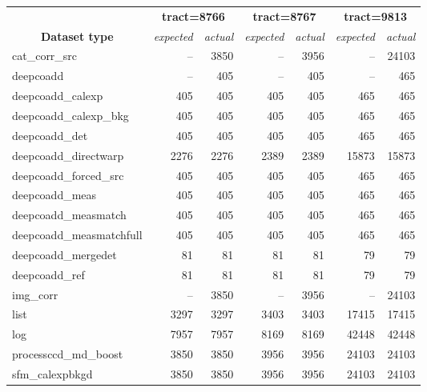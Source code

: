 \begin{table}
	\caption{
		File counts. Expected values came from corresponding weekly RC
		exections. Symbol \dag{} dentoes dataset types which differs from
		weekly execution and \ddag{} indicates DESDM specific dataset types.
	}
	\label{tab:count}
	\footnotesize
	\begin{longtable}{lrrrrrr}
		\hline\hline
		                                          &
		\multicolumn{2}{c}{\textbf{tract=8766}}   &
		\multicolumn{2}{c}{\textbf{tract=8767}}   &
		\multicolumn{2}{c}{\textbf{tract=9813}}   \\
		\multicolumn{1}{c}{\textbf{Dataset type}} &
		\multicolumn{1}{c}{\textit{expected}}     &
		\multicolumn{1}{c}{\textit{actual}}       &
		\multicolumn{1}{c}{\textit{expected}}     &
		\multicolumn{1}{c}{\textit{actual}}       &
		\multicolumn{1}{c}{\textit{expected}}     &
		\multicolumn{1}{c}{\textit{actual}}       \\
		\hline\hline
		cat\_corr\_src\dag & -- & 3850 & -- & 3956 & -- & 24103 \\
		deepcoadd\dag & -- & 405 & -- & 405 & -- & 465 \\
		deepcoadd\_calexp & 405 & 405 & 405 & 405 & 465 & 465 \\
		deepcoadd\_calexp\_bkg & 405 & 405 & 405 & 405 & 465 & 465 \\
		deepcoadd\_det & 405 & 405 & 405 & 405 & 465 & 465 \\
		deepcoadd\_directwarp & 2276 & 2276 & 2389 & 2389 & 15873 & 15873 \\
		deepcoadd\_forced\_src & 405 & 405 & 405 & 405 & 465 & 465 \\
		deepcoadd\_meas & 405 & 405 & 405 & 405 & 465 & 465 \\
		deepcoadd\_measmatch & 405 & 405 & 405 & 405 & 465 & 465 \\
		deepcoadd\_measmatchfull & 405 & 405 & 405 & 405 & 465 & 465 \\
		deepcoadd\_mergedet & 81 & 81 & 81 & 81 & 79 & 79 \\
		deepcoadd\_ref & 81 & 81 & 81 & 81 & 79 & 79 \\
		img\_corr\dag & -- & 3850 & -- & 3956 & -- & 24103 \\
		list\ddag & 3297 & 3297 & 3403 & 3403 & 17415 & 17415 \\
		log\ddag & 7957 & 7957 & 8169 & 8169 & 42448 & 42448 \\
		processccd\_md\_boost & 3850 & 3850 & 3956 & 3956 & 24103 & 24103 \\
		sfm\_calexpbkgd & 3850 & 3850 & 3956 & 3956 & 24103 & 24103 \\

\end{longtable}
\end{table}
